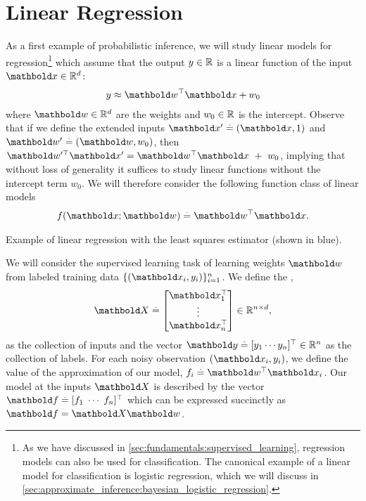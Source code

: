 \chapter{Linear Regression}\label{sec:blr}

As a first example of probabilistic inference, we will study linear models for regression\footnote{As we have discussed in \cref{sec:fundamentals:supervised_learning}, regression models can also be used for classification. The canonical example of a linear model for classification is logistic regression, which we will discuss in \cref{sec:approximate_inference:bayesian_logistic_regression}.} which assume that the output $y \in \mathbb{R}$ is a linear function of the input $\vx \in \R^d$: \begin{align*}
  y \approx \transpose{\vw}\vx + w_0
\end{align*} where $\vw \in \R^d$ are the weights and $w_0 \in \mathbb{R}$ is the intercept.
Observe that if we define the extended inputs $\vx' \defeq (\vx, 1)$ and $\vw' \defeq (\vw, w_0)$, then $\transpose{\vw'}\vx' = \transpose{\vw}\vx~+~w_0$, implying that without loss of generality it suffices to study linear functions without the intercept term $w_0$.
We will therefore consider the following function class of linear models \begin{align*}
  f(\vx; \vw) \defeq \transpose{\vw} \vx.
\end{align*}

\begin{marginfigure}
  \caption{Example of linear regression with the least squares estimator (shown in blue).}\label{fig:lr}
\end{marginfigure}

We will consider the supervised learning task of learning weights $\vw$ from labeled training data $\{(\vx_i, y_i)\}_{i=1}^n$.
We define the , \begin{align}
  \mX \defeq \begin{bmatrix}
    \transpose{\vx_1} \\
    \vdots \\
    \transpose{\vx_n} \\
  \end{bmatrix} \in \R^{n \times d},
\end{align} as the collection of inputs and the vector $\vy \defeq \transpose{[y_1 \cdots y_n]} \in \R^n$ as the collection of labels.
For each noisy observation $(\vx_i, y_i)$, we define the value of the approximation of our model, $f_i \defeq \transpose{\vw} \vx_i$.
Our model at the inputs $\mX$ is described by the vector $\vf \defeq \transpose{[f_1 \; \cdots \; f_n]}$ which can be expressed succinctly as $\vf = \mX \vw$.

